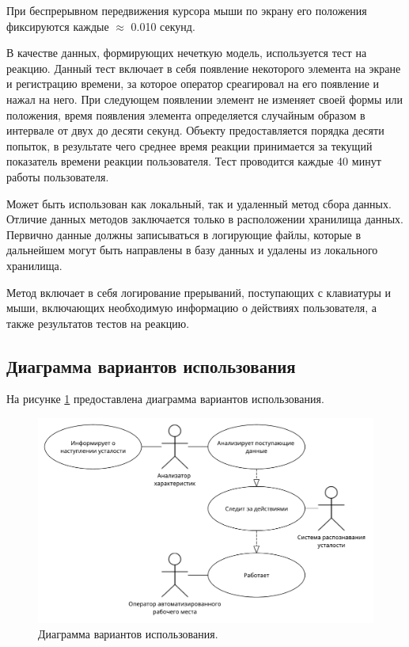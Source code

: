 При беспрерывном передвижения курсора мыши по экрану его положения фиксируются каждые $\approx$ 0.010 секунд.

В качестве данных, формирующих нечеткую модель, используется тест на реакцию. Данный тест включает в себя появление некоторого элемента на экране и регистрацию времени, за которое оператор среагировал на его появление и нажал на него. При следующем появлении элемент не изменяет своей формы или положения, время появления элемента определяется случайным образом в интервале от двух до десяти секунд. Объекту предоставляется порядка десяти попыток, в результате чего среднее время реакции принимается за текущий показатель времени реакции пользователя. Тест проводится каждые 40 минут работы пользователя.

Может быть использован как локальный, так и удаленный метод сбора данных. Отличие данных методов заключается только в расположении хранилища данных. Первично данные должны записываться в логирующие файлы, которые в дальнейшем могут быть направлены в базу данных и удалены из локального хранилища.

Метод включает в себя логирование прерываний, поступающих с клавиатуры и мыши, включающих необходимую информацию о действиях пользователя, а также результатов тестов на реакцию.

\subsection{Диаграмма вариантов использования}
На рисунке \ref{fig:useCase} предоставлена диаграмма вариантов использования.
\begin{figure}[H]
	\centering
	\includegraphics[width=\textwidth]{img/useCaseDiagram.pdf}
	\caption{Диаграмма вариантов использования.}
	\label{fig:useCase}
\end{figure}

